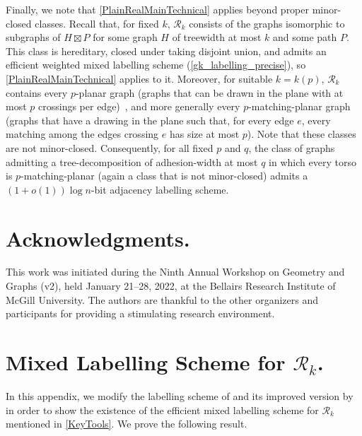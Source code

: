 \documentclass[twoside,leqno]{article}
\begin{document}
Finally, we note that \cref{PlainRealMainTechnical} applies beyond proper
minor-closed classes. Recall that, for fixed $k$, $\mathcal{R}_k$ consists of
the graphs isomorphic to subgraphs of $H\boxtimes P$ for some graph $H$ of
treewidth at most $k$ and some path $P$. This class is hereditary, closed
under taking disjoint union, and admits an efficient weighted mixed labelling
scheme (\cref{gk_labelling_precise}), so \cref{PlainRealMainTechnical} applies
to it. Moreover, for suitable $k=k(p)$, $\mathcal{R}_k$ contains every
$p$-planar graph (graphs that can be drawn in the plane with at most $p$
crossings per edge)~\citep{dujmovic.morin.ea:graph}, and more generally every
$p$-matching-planar graph~\citep{DBLP:journals/corr/abs-2507-22395} (graphs that have a drawing in the plane such that, for every edge $e$, every
matching among the edges crossing $e$ has size at most $p$). Note that these classes are not minor-closed. Consequently, for all fixed $p$ and $q$, the class of graphs admitting a tree-decomposition of adhesion-width at most $q$ in which every
torso is $p$-matching-planar (again a class that is not minor-closed)
 admits a $(1+o(1))\log n$-bit adjacency labelling scheme.


\section*{Acknowledgments.} 
This work was initiated during the Ninth Annual Workshop on Geometry and Graphs (v2), held January 21--28, 2022, at the Bellairs Research Institute of McGill University.  The authors are thankful to the other organizers and participants for providing a stimulating research environment.

\setlength{\bibsep}{0.3ex plus 0.1ex minus 0.1ex}



\appendix
{}

\section{Mixed Labelling Scheme for \texorpdfstring{$\mathcal{R}_k$}{Rk}.}
\label{weighted_product_proof}

In this appendix, we modify the labelling scheme of \citet{dujmovic.esperet.ea:adjacency} and its improved version by \citet{gawrychowski.janczewski:simpler} in order to show the existence of the efficient mixed labelling scheme for $\mathcal{R}_k$ mentioned in \cref{KeyTools}.  We prove the following result.
\end{document}

